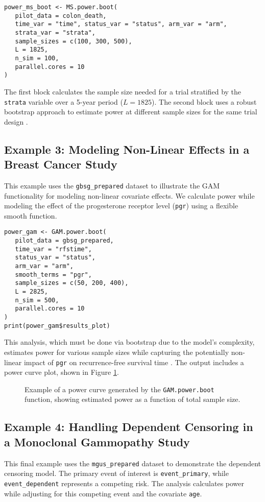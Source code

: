 \documentclass[11pt, a4paper]{article}
\begin{document}
\begin{lstlisting}
power_ms_boot <- MS.power.boot(
   pilot_data = colon_death,
   time_var = "time", status_var = "status", arm_var = "arm",
   strata_var = "strata",
   sample_sizes = c(100, 300, 500),
   L = 1825,
   n_sim = 100, 
   parallel.cores = 10 
)
\end{lstlisting}
The first block calculates the sample size needed for a trial stratified by the \texttt{strata} variable over a 5-year period ($L=1825$). The second block uses a robust bootstrap approach to estimate power at different sample sizes for the same trial design \cite{[1]}.

\subsection{Example 3: Modeling Non-Linear Effects in a Breast Cancer Study}
This example uses the \texttt{gbsg\_prepared} dataset to illustrate the GAM functionality for modeling non-linear covariate effects. We calculate power while modeling the effect of the progesterone receptor level (\texttt{pgr}) using a flexible smooth function.

\begin{lstlisting}
power_gam <- GAM.power.boot(
   pilot_data = gbsg_prepared,
   time_var = "rfstime",
   status_var = "status",
   arm_var = "arm",
   smooth_terms = "pgr",
   sample_sizes = c(50, 200, 400),
   L = 2825,
   n_sim = 500,
   parallel.cores = 10
)
print(power_gam$results_plot)
\end{lstlisting}
This analysis, which must be done via bootstrap due to the model's complexity, estimates power for various sample sizes while capturing the potentially non-linear impact of \texttt{pgr} on recurrence-free survival time \cite{[1]}. The output includes a power curve plot, shown in Figure \ref{fig:gam_plot}.

\begin{figure}[h!]
    \centering
    \caption{Example of a power curve generated by the \texttt{GAM.power.boot} function, showing estimated power as a function of total sample size.}
    \label{fig:gam_plot}
\end{figure}

\subsection{Example 4: Handling Dependent Censoring in a Monoclonal Gammopathy Study}
This final example uses the \texttt{mgus\_prepared} dataset to demonstrate the dependent censoring model. The primary event of interest is \texttt{event\_primary}, while \texttt{event\_dependent} represents a competing risk. The analysis calculates power while adjusting for this competing event and the covariate \texttt{age}.
\end{document}

